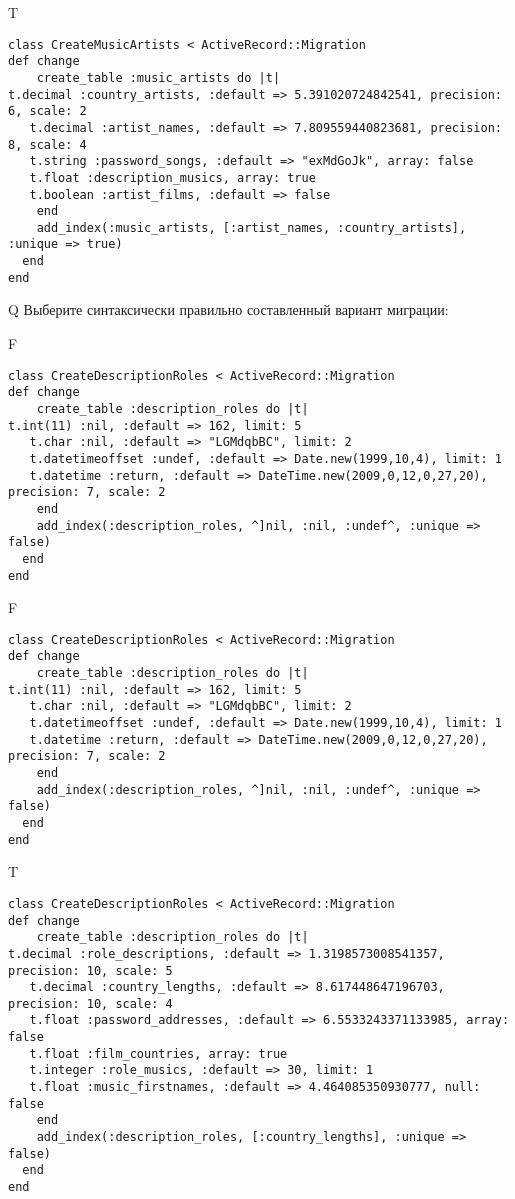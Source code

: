 T
\begin{verbatim}
class CreateMusicArtists < ActiveRecord::Migration
def change
	create_table :music_artists do |t|
t.decimal :country_artists, :default => 5.391020724842541, precision: 6, scale: 2
   t.decimal :artist_names, :default => 7.809559440823681, precision: 8, scale: 4
   t.string :password_songs, :default => "exMdGoJk", array: false
   t.float :description_musics, array: true
   t.boolean :artist_films, :default => false
   	end
	add_index(:music_artists, [:artist_names, :country_artists], :unique => true)
  end 
end

\end{verbatim}

Q
Выберите синтаксически правильно составленный вариант миграции:

F
\begin{verbatim}
class CreateDescriptionRoles < ActiveRecord::Migration
def change
	create_table :description_roles do |t|
t.int(11) :nil, :default => 162, limit: 5
   t.char :nil, :default => "LGMdqbBC", limit: 2
   t.datetimeoffset :undef, :default => Date.new(1999,10,4), limit: 1
   t.datetime :return, :default => DateTime.new(2009,0,12,0,27,20), precision: 7, scale: 2
   	end
	add_index(:description_roles, ^]nil, :nil, :undef^, :unique => false)
  end 
end

\end{verbatim}

F
\begin{verbatim}
class CreateDescriptionRoles < ActiveRecord::Migration
def change
	create_table :description_roles do |t|
t.int(11) :nil, :default => 162, limit: 5
   t.char :nil, :default => "LGMdqbBC", limit: 2
   t.datetimeoffset :undef, :default => Date.new(1999,10,4), limit: 1
   t.datetime :return, :default => DateTime.new(2009,0,12,0,27,20), precision: 7, scale: 2
   	end
	add_index(:description_roles, ^]nil, :nil, :undef^, :unique => false)
  end 
end

\end{verbatim}

T
\begin{verbatim}
class CreateDescriptionRoles < ActiveRecord::Migration
def change
	create_table :description_roles do |t|
t.decimal :role_descriptions, :default => 1.3198573008541357, precision: 10, scale: 5
   t.decimal :country_lengths, :default => 8.617448647196703, precision: 10, scale: 4
   t.float :password_addresses, :default => 6.5533243371133985, array: false
   t.float :film_countries, array: true
   t.integer :role_musics, :default => 30, limit: 1
   t.float :music_firstnames, :default => 4.464085350930777, null: false
   	end
	add_index(:description_roles, [:country_lengths], :unique => false)
  end 
end

\end{verbatim}

